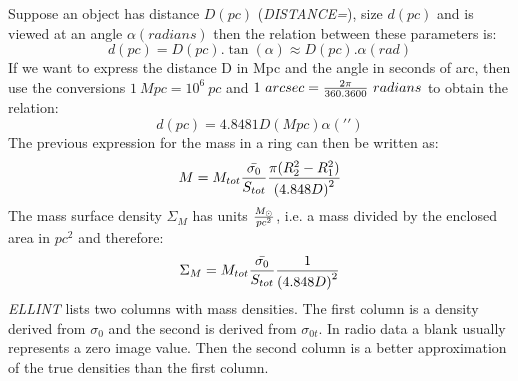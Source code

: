 \noindent
Suppose an object has distance $D(pc)$ ({\it DISTANCE=}), size $d(pc)$ and is 
viewed at an angle
$\alpha(radians)$ then the relation between these parameters is:
$$d(pc) = D(pc).\tan(\alpha) \approx D(pc).\alpha(rad)$$
If we want to express the distance D in Mpc and the angle in seconds of
arc, then use the conversions $1\ Mpc = 10^6\ pc$ and $1\ arcsec = {2\pi\over{360.3600}}\ radians$
to obtain the relation: 
\begin{equation}
d(pc) = 4.8481 D(Mpc) \alpha({\prime\prime})
\end{equation}
The previous expression for the mass in a ring can then be written as:
\begin{equation}
M = M_{tot} {\bar{\sigma_0} \over{S_{tot}}} {\pi (R_{2}^2-R_{1}^2) \over{{(4.848D)}^2}}
\end{equation}
The mass surface density $\Sigma_M$ has units 
$M_\odot \over{pc^2}$,  i.e. a mass divided by the enclosed area in $pc^2$ 
and therefore:
\begin{equation}
\Sigma_M = M_{tot} {\bar{\sigma_0} \over{S_{tot}}} {1 \over{{(4.848D)}^2}}
\end{equation}
{\it ELLINT} lists two columns with mass densities. The first column is a density
derived from $\sigma_{0}$ and the second is derived from $\sigma_{0t}$. In radio data
a blank usually represents a zero image value. Then the second column is a better 
approximation of the true densities than the first column.

